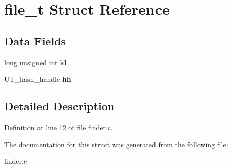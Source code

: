 \hypertarget{structfile__t}{}\section{file\+\_\+t Struct Reference}
\label{structfile__t}
\subsection*{Data Fields}
\begin{DoxyCompactItemize}
\item 
long unsigned int {\bfseries id}\hypertarget{structfile__t_a44a772348760d7ca8095f707f652498a}{}\label{structfile__t_a44a772348760d7ca8095f707f652498a}

\item 
U\+T\+\_\+hash\+\_\+handle {\bfseries hh}\hypertarget{structfile__t_a67d3d81a4f9a9622b0befade8d131661}{}\label{structfile__t_a67d3d81a4f9a9622b0befade8d131661}

\end{DoxyCompactItemize}


\subsection{Detailed Description}


Definition at line 12 of file finder.\+c.



The documentation for this struct was generated from the following file\+:\begin{DoxyCompactItemize}
\item 
finder.\+c\end{DoxyCompactItemize}
